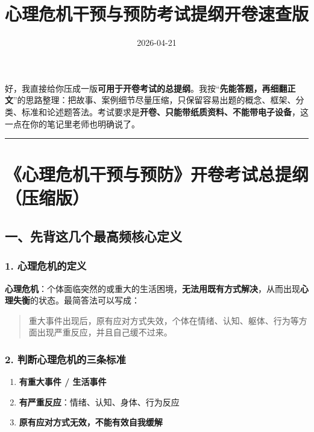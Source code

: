 \documentclass[
  a4paper,
]{ctexart}
\title{心理危机干预与预防考试提纲开卷速查版}
\author{}
\date{2026-04-21}
\providecommand{\tightlist}{%
  \setlength{\itemsep}{0pt}\setlength{\parskip}{0pt}}
\begin{document}
\maketitle

{
\hypersetup{linkcolor=}
\setcounter{tocdepth}{4}
\tableofcontents
}
好，我直接给你压成一版\textbf{可用于开卷考试的总提纲}。我按``\textbf{先能答题，再细翻正文}''的思路整理：把故事、案例细节尽量压缩，只保留容易出题的概念、框架、分类、标准和论述题答法。考试要求是\textbf{开卷、只能带纸质资料、不能带电子设备}，这一点在你的笔记里老师也明确说了。

\begin{center}\rule{0.5\linewidth}{0.5pt}\end{center}

\section{《心理危机干预与预防》开卷考试总提纲（压缩版）}\label{ux5fc3ux7406ux5371ux673aux5e72ux9884ux4e0eux9884ux9632ux5f00ux5377ux8003ux8bd5ux603bux63d0ux7eb2ux538bux7f29ux7248}

\subsection{一、先背这几个最高频核心定义}\label{ux4e00ux5148ux80ccux8fd9ux51e0ux4e2aux6700ux9ad8ux9891ux6838ux5fc3ux5b9aux4e49}

\subsubsection{1.
心理危机的定义}\label{ux5fc3ux7406ux5371ux673aux7684ux5b9aux4e49}

\textbf{心理危机}：个体面临突然的或重大的生活困境，\textbf{无法用既有方式解决}，从而出现\textbf{心理失衡}的状态。最简答法可以写成：

\begin{quote}
重大事件出现后，原有应对方式失效，个体在情绪、认知、躯体、行为等方面出现严重反应，并且自己缓不过来。
\end{quote}

\subsubsection{2.
判断心理危机的三条标准}\label{ux5224ux65adux5fc3ux7406ux5371ux673aux7684ux4e09ux6761ux6807ux51c6}

\begin{enumerate}
\def\labelenumi{\arabic{enumi}.}
\tightlist
\item
  \textbf{有重大事件 / 生活事件}
\item
  \textbf{有严重反应}：情绪、认知、身体、行为反应
\item
  \textbf{原有应对方式无效，不能有效自我缓解}
\end{enumerate}
\end{document}

